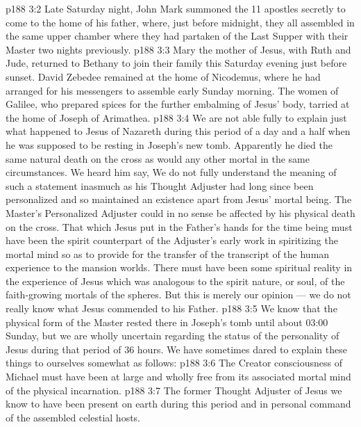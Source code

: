\vs p188 3:2 Late Saturday night, John Mark summoned the 11 apostles secretly to come to the home of his father, where, just before midnight, they all assembled in the same upper chamber where they had partaken of the Last Supper with their Master two nights previously.
\vs p188 3:3 Mary the mother of Jesus, with Ruth and Jude, returned to Bethany to join their family this Saturday evening just before sunset. David Zebedee remained at the home of Nicodemus, where he had arranged for his messengers to assemble early Sunday morning. The women of Galilee, who prepared spices for the further embalming of Jesus’ body, tarried at the home of Joseph of Arimathea.
\vs p188 3:4 \pc We are not able fully to explain just what happened to Jesus of Nazareth during this period of a day and a half when he was supposed to be resting in Joseph’s new tomb. Apparently he died the same natural death on the cross as would any other mortal in the same circumstances. We heard him say,  We do not fully understand the meaning of such a statement inasmuch as his Thought Adjuster had long since been personalized and so maintained an existence apart from Jesus’ mortal being. The Master’s Personalized Adjuster could in no sense be affected by his physical death on the cross. That which Jesus put in the Father’s hands for the time being must have been the spirit counterpart of the Adjuster’s early work in spiritizing the mortal mind so as to provide for the transfer of the transcript of the human experience to the mansion worlds. There must have been some spiritual reality in the experience of Jesus which was analogous to the spirit nature, or soul, of the faith\hyp{}growing mortals of the spheres. But this is merely our opinion --- we do not really know what Jesus commended to his Father.
\vs p188 3:5 We know that the physical form of the Master rested there in Joseph’s tomb until about 03:00 Sunday, but we are wholly uncertain regarding the status of the personality of Jesus during that period of 36 hours. We have sometimes dared to explain these things to ourselves somewhat as follows:
\vs p188 3:6 \bibnobreakspace The Creator consciousness of Michael must have been at large and wholly free from its associated mortal mind of the physical incarnation.
\vs p188 3:7 \bibnobreakspace The former Thought Adjuster of Jesus we know to have been present on earth during this period and in personal command of the assembled celestial hosts.
